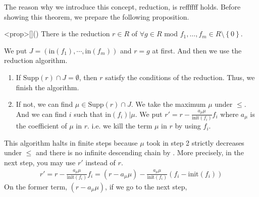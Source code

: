 \documentclass{article}
\begin{document}
The reason why we introduce this concept, reduction, is reffffff holds. Before showing this theorem, we prepare the following proposition.

\begin{statementsp}<prop>[]()
    There is the reduction $r \in R$ of $\forall g \in R$ mod $f_1, \ldots, f_m \in R \setminus \left\{ 0 \right\}$.
\end{statementsp}
\begin{pfsp}
    We put $J = \left( \mathrm{in}(f_1), \cdots, \mathrm{in}(f_m) \right)$ and $r = g$ at first. And then we use the reduction algorithm.
    \begin{enumerate}
        \item If $\mathrm{Supp}(r) \cap J = \emptyset$, then $r$ satisfy the conditions of the reduction. Thus, we finish the algorithm.
        \item If not, we can find $\mu \in \mathrm{Supp}(r) \cap J$. We take the maximum $\mu$ under $\leq$. And we can find $i$ such that $\mathrm{in}(f_i) \vert \mu$. We put $\displaystyle{r' = r - \frac{a_{\mu} \mu}{\mathrm{init}(f_i)} f_i}$ where $a_{\mu}$ is the coefficient of $\mu$ in $r$. i.e. we kill the term $\mu$ in $r$ by using $f_i$. 
    \end{enumerate}
    This algorithm halts in finite steps because $\mu$ took in step 2 strictly decreases under $\leq$ and there is no infinite descending chain by . More precisely, in the next step, you may use $r'$ instead of $r$. 
    \begin{align}
        r' = r - \frac{a_{\mu} \mu}{\mathrm{init}(f_i)} f_i = (r - a_{\mu} \mu) - \frac{a_{\mu} \mu}{\mathrm{init}(f_i)} \left( f_i - \mathrm{init}(f_i) \right)
    \end{align}
    On the former term, $(r-a_{\mu} \mu)$, if we go to the next step, 
\end{pfsp}

\newpage 

{}

\end{document}
